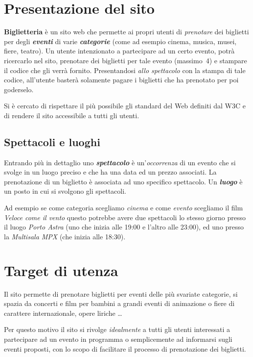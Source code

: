 \documentclass[10pt, a4paper]{article}
\begin{document}
\section{Presentazione del sito}
\textbf{\textcolor{UniPD}{Biglietteria}} è un sito web che permette ai propri utenti di
\emph{prenotare} dei biglietti per degli \textbf{\emph{eventi}} di varie 
\textbf{\emph{categorie}} (come ad esempio cinema, musica, musei, fiere, teatro).
Un utente intenzionato a partecipare ad un certo evento, potrà ricercarlo nel sito,
prenotare dei biglietti per tale evento (massimo~4) e stampare il codice che gli verrà fornito.
Presentandosi \emph{allo spettacolo} con la stampa di tale codice, 
all'utente basterà solamente pagare i biglietti che ha prenotato per poi goderselo.

Si è cercato di rispettare il più possibile gli standard del Web definiti dal W3C e
di rendere il sito accessibile a tutti gli utenti.



\subsection{Spettacoli e  luoghi}
Entrando più in dettaglio uno \textbf{\emph{spettacolo}} è un'\emph{occorrenza}
di un evento che si svolge in un luogo preciso e che ha una data ed un prezzo associati.
La prenotazione di un biglietto è associata ad uno specifico spettacolo.
Un \textbf{\emph{luogo}} è un posto in cui si svolgono gli spettacoli.

Ad esempio se come categoria scegliamo \emph{cinema} e come \emph{evento} scegliamo il
film \emph{Veloce come il vento} questo potrebbe avere due spettacoli lo stesso giorno presso
il luogo \emph{Porto Astra} (uno che inizia alle 19:00 e l'altro alle 23:00), ed uno presso la
\emph{Multisala MPX} (che inizia alle 18:30).
\section{Target di utenza}
Il sito permette di prenotare biglietti per eventi delle più svariate categorie, si spazia da concerti e film per bambini
a grandi eventi di animazione o fiere di carattere internazionale, opere liriche \dots

Per questo motivo il sito si rivolge \emph{idealmente} a tutti gli utenti interessati a partecipare
ad un evento in programma o semplicemente ad informarsi sugli eventi proposti, con lo
scopo di facilitare il processo di prenotazione dei biglietti.
\end{document}
